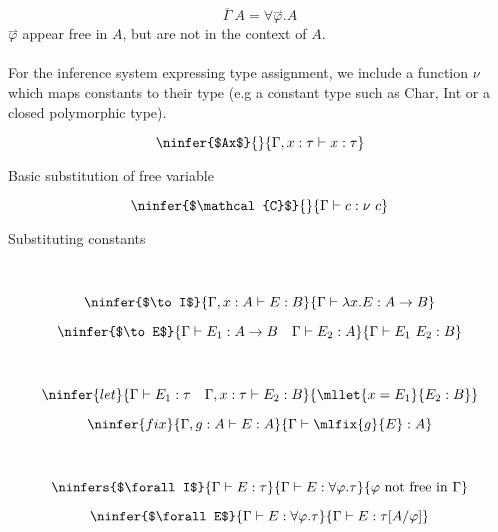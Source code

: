 \[\overline{\Gamma} \ A = \forall \overset{\rightharpoonup}{\varphi} . A\]
$\overset{\rightharpoonup}{\varphi}$ appear free in $A$, but are not in the context of $A$.
\\
\\ For the inference system expressing type assignment, we include a function $\nu$ which maps constants to their type (e.g a constant type such as Char, Int or a closed polymorphic type).
\\ \begin{minipage}[b]{.5\textwidth}
    \[\ninfer{$Ax$}{}{\Gamma, x:\tau \vdash x : \tau}\]
    \centerline{Basic substitution of free variable}
\end{minipage}
\begin{minipage}[b]{.5\textwidth}
    \[\ninfer{$\mathcal{C}$}{}{\Gamma \vdash c : \nu \ c}\]
    \centerline{Substituting constants}
\end{minipage}
\vspace{2mm}
\\ \begin{minipage}[b]{.5\textwidth}
    \[\ninfer{$\to I$}{\Gamma, x:A \vdash E : B}{\Gamma \vdash \lambda x . E : A \to B}\]
\end{minipage}
\begin{minipage}[b]{.5\textwidth}
    \[\ninfer{$\to E$}{\Gamma \vdash E_1 : A \to B \quad \Gamma \vdash E_2 : A}{\Gamma \vdash E_1 \ E_2 : B}\]
\end{minipage}
\vspace{2mm}
\\ \begin{minipage}[b]{.5\textwidth}
    \[\ninfer{let}{\Gamma \vdash E_1 : \tau \quad \Gamma, x: \tau \vdash E_2 : B}{\mllet{x = E_1}{E_2 : B}}\]
\end{minipage}
\begin{minipage}[b]{.5\textwidth}
    \[\ninfer{fix}{\Gamma, g:A \vdash E : A}{\Gamma \vdash \mlfix{g}{E} : A}\]
\end{minipage}
\vspace{2mm}
\\ \begin{minipage}[b]{.5\textwidth}
    \[\ninfers{$\forall I$}{\Gamma \vdash E : \tau}{\Gamma \vdash E : \forall \varphi . \tau}{\varphi \text{ not free in } \Gamma}  \]
\end{minipage}
\begin{minipage}[b]{.5\textwidth}
    \[\ninfer{$\forall E$}{\Gamma \vdash E : \forall \varphi . \tau}{\Gamma \vdash E : \tau [A / \varphi]}\]
\end{minipage}
